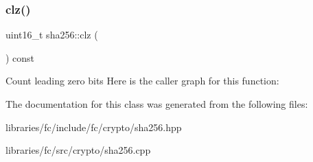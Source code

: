\subsubsection{\texorpdfstring{clz()}{clz()}}
{\footnotesize\ttfamily uint16\+\_\+t sha256\+::clz (\begin{DoxyParamCaption}{ }\end{DoxyParamCaption}) const}

Count leading zero bits Here is the caller graph for this function\+:


The documentation for this class was generated from the following files\+:\begin{DoxyCompactItemize}
\item 
libraries/fc/include/fc/crypto/sha256.\+hpp\item 
libraries/fc/src/crypto/sha256.\+cpp\end{DoxyCompactItemize}
